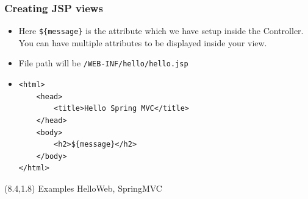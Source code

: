 \documentclass[10pt,xcolor=pdflatex, table]{beamer}
\begin{document}
\begin{frame}[fragile]\frametitle{Creating JSP views}
	\begin{itemize}
		\item Here \texttt{\$\{message\}} is the attribute which we have setup inside the Controller. You can have multiple attributes to be displayed inside your view.
        \medskip
		\item File path will be \texttt{/WEB-INF/hello/hello.jsp}
		\item[]
        	\medskip
            \begin{verbatim}
<html>
    <head>
        <title>Hello Spring MVC</title>
    </head>
    <body>
        <h2>${message}</h2>
    </body>
</html>
            \end{verbatim}
	\end{itemize}
\begin{textblock}{15}(8.4,1.8)
    {\footnotesize Examples HelloWeb, SpringMVC}
\end{textblock}
\end{frame}
\end{document}
